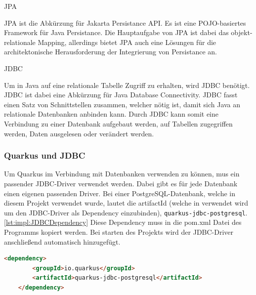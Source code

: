 \begin{compactitem}
    \item [JPA]
    \item JPA ist die Abkürzung für Jakarta Persistance API. Es ist eine POJO-basiertes Framework für Java Persistance. Die Hauptaufgabe von JPA ist dabei das objekt-relationale Mapping, allerdings bietet JPA auch eine Lösungen für die architektonische Herausforderung der Integrierung von Persistance an. 
    \item [JDBC]
    \item Um in Java auf eine relationale Tabelle Zugriff zu erhalten, wird JDBC benötigt. JDBC ist dabei eine Abkürzung für Java Database Connectivity. JDBC fasst einen Satz von Schnittstellen zusammen, welcher nötig ist, damit sich Java an relationale Datenbanken anbinden kann. Durch JDBC kann somit eine Verbindung zu einer Datenbank aufgebaut werden, auf Tabellen zugegriffen werden, Daten ausgelesen oder verändert werden.  
\end{compactitem}


\subsubsection{Quarkus und JDBC}
Um Quarkus im Verbindung mit Datenbanken verwenden zu können, mus ein passender JDBC-Driver verwendet werden. Dabei gibt es für jede Datenbank einen eigenen passenden Driver. Bei einer PostgreSQL-Datenbank, welche in diesem Projekt verwendet wurde, lautet die artifactId (welche in verwendet wird um den JDBC-Driver als Dependency einzubinden), \texttt{quarkus-jdbc-postgresql}. \ref{lst:impl:JDBCDependency} Diese Dependency muss in die pom.xml Datei des Programms kopiert werden. Bei starten des Projekts wird der JDBC-Driver anschließend automatisch hinzugefügt.

\begin{lstlisting}[language=html,caption=JDBC Dependency,label=lst:impl:JDBCDependency]
    <dependency>
        <groupId>io.quarkus</groupId>
        <artifactId>quarkus-jdbc-postgresql</artifactId>
    </dependency>
  \end{lstlisting}

